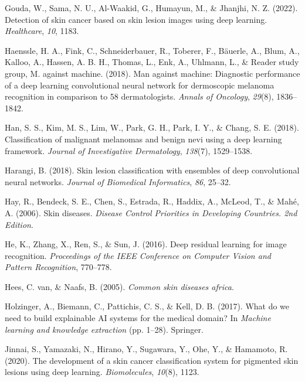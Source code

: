 \documentclass[
  12pt,
  oneside]{article}
\newlength{\cslhangindent}
\newenvironment{CSLReferences}[2] %
 {\begin{list}{}{%
  \setlength{\itemindent}{0pt}
  \setlength{\leftmargin}{0pt}
  \setlength{\parsep}{0pt}
  \ifodd #1
   \setlength{\leftmargin}{\cslhangindent}
   \setlength{\itemindent}{-1\cslhangindent}
  \fi
  \setlength{\itemsep}{#2\baselineskip}}}
 {\end{list}}
\begin{document}
\begin{CSLReferences}{1}{0}
Gouda, W., Sama, N. U., Al-Waakid, G., Humayun, M., \& Jhanjhi, N. Z.
(2022). Detection of skin cancer based on skin lesion images using deep
learning. \emph{Healthcare}, \emph{10}, 1183.

Haenssle, H. A., Fink, C., Schneiderbauer, R., Toberer, F., Bäuerle, A.,
Blum, A., Kalloo, A., Hassen, A. B. H., Thomas, L., Enk, A., Uhlmann,
L., \& Reader study group, M. against machine. (2018). Man against
machine: Diagnostic performance of a deep learning convolutional neural
network for dermoscopic melanoma recognition in comparison to 58
dermatologists. \emph{Annals of Oncology}, \emph{29}(8), 1836--1842.

Han, S. S., Kim, M. S., Lim, W., Park, G. H., Park, I. Y., \& Chang, S.
E. (2018). Classification of malignant melanomas and benign nevi using a
deep learning framework. \emph{Journal of Investigative Dermatology},
\emph{138}(7), 1529--1538.

Harangi, B. (2018). Skin lesion classification with ensembles of deep
convolutional neural networks. \emph{Journal of Biomedical Informatics},
\emph{86}, 25--32.

Hay, R., Bendeck, S. E., Chen, S., Estrada, R., Haddix, A., McLeod, T.,
\& Mahé, A. (2006). Skin diseases. \emph{Disease Control Priorities in
Developing Countries. 2nd Edition}.

He, K., Zhang, X., Ren, S., \& Sun, J. (2016). Deep residual learning
for image recognition. \emph{Proceedings of the IEEE Conference on
Computer Vision and Pattern Recognition}, 770--778.

Hees, C. van, \& Naafs, B. (2005). \emph{Common skin diseases africa}.

Holzinger, A., Biemann, C., Pattichis, C. S., \& Kell, D. B. (2017).
What do we need to build explainable AI systems for the medical domain?
In \emph{Machine learning and knowledge extraction} (pp. 1--28).
Springer.

Jinnai, S., Yamazaki, N., Hirano, Y., Sugawara, Y., Ohe, Y., \&
Hamamoto, R. (2020). The development of a skin cancer classification
system for pigmented skin lesions using deep learning.
\emph{Biomolecules}, \emph{10}(8), 1123.


\end{CSLReferences}
\end{document}
